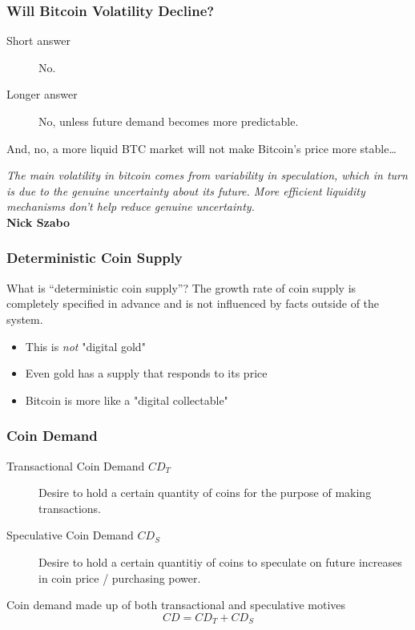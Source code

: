 \documentclass{beamer}
\begin{document}
\begin{frame}
  \frametitle{Will Bitcoin Volatility Decline?}

  \begin{description}
  \item[Short answer] No.
  \item[Longer answer] No, unless future demand becomes more
    predictable.
  \end{description}
  
  And, no, a more liquid BTC market will not make Bitcoin's
  price more stable\dots

  \begin{block}{}
    \emph{The main volatility in bitcoin comes from variability in
    speculation, which in turn is due to the genuine uncertainty about
    its future. More efficient liquidity mechanisms don't help
    reduce genuine uncertainty.}\\\textbf{Nick Szabo}
  \end{block}
  
\end{frame}

\begin{frame}
  \frametitle{Deterministic Coin Supply}

  \begin{block}{What is ``deterministic coin supply''?}
    The growth rate of coin supply is completely specified in advance
    and is not influenced by facts outside of the system.
  \end{block}

  \begin{itemize}
  \item This is \emph{not} "digital gold"
  \item Even gold has a supply that responds to its price
  \item Bitcoin is more like a "digital collectable"
  \end{itemize}

\end{frame}

\begin{frame}
  \frametitle{Coin Demand}
  \begin{description}
  \item[Transactional Coin Demand $CD_{T}$] Desire to hold a certain
    quantity of coins for the purpose of making transactions.
  \item[Speculative Coin Demand $CD_{S}$] Desire to hold a certain
    quantitiy of coins to speculate on future increases in coin
    price / purchasing power. 
  \end{description}

  \begin{block}{Coin demand made up of both transactional and
      speculative motives}
    \begin{equation*}
      CD = CD_{T} + CD_{S}  
    \end{equation*}
  \end{block}
\end{frame}
\end{document}
